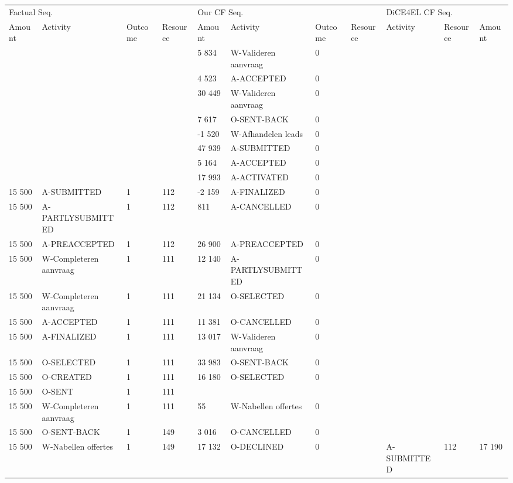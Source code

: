\begin{tabular}{lllllllllll}
\toprule
\multicolumn{4}{l}{Factual Seq.} & \multicolumn{4}{l}{Our CF Seq.} & \multicolumn{3}{l}{DiCE4EL CF Seq.} \\
Amount & Activity & Outcome & Resource & Amount & Activity & Outcome & Resource & Activity & Resource & Amount \\
\midrule
 &  &  &  & 5 834 & W-Valideren aanvraag & 0 &  &  &  &  \\
 &  &  &  & 4 523 & A-ACCEPTED & 0 &  &  &  &  \\
 &  &  &  & 30 449 & W-Valideren aanvraag & 0 &  &  &  &  \\
 &  &  &  & 7 617 & O-SENT-BACK & 0 &  &  &  &  \\
 &  &  &  & -1 520 & W-Afhandelen leads & 0 &  &  &  &  \\
 &  &  &  & 47 939 & A-SUBMITTED & 0 &  &  &  &  \\
 &  &  &  & 5 164 & A-ACCEPTED & 0 &  &  &  &  \\
 &  &  &  & 17 993 & A-ACTIVATED & 0 &  &  &  &  \\
15 500 & A-SUBMITTED & 1 & 112 & -2 159 & A-FINALIZED & 0 &  &  &  &  \\
15 500 & A-PARTLYSUBMITTED & 1 & 112 & 811 & A-CANCELLED & 0 &  &  &  &  \\
15 500 & A-PREACCEPTED & 1 & 112 & 26 900 & A-PREACCEPTED & 0 &  &  &  &  \\
15 500 & W-Completeren aanvraag & 1 & 111 & 12 140 & A-PARTLYSUBMITTED & 0 &  &  &  &  \\
15 500 & W-Completeren aanvraag & 1 & 111 & 21 134 & O-SELECTED & 0 &  &  &  &  \\
15 500 & A-ACCEPTED & 1 & 111 & 11 381 & O-CANCELLED & 0 &  &  &  &  \\
15 500 & A-FINALIZED & 1 & 111 & 13 017 & W-Valideren aanvraag & 0 &  &  &  &  \\
15 500 & O-SELECTED & 1 & 111 & 33 983 & O-SENT-BACK & 0 &  &  &  &  \\
15 500 & O-CREATED & 1 & 111 & 16 180 & O-SELECTED & 0 &  &  &  &  \\
15 500 & O-SENT & 1 & 111 &  &  &  &  &  &  &  \\
15 500 & W-Completeren aanvraag & 1 & 111 & 55 & W-Nabellen offertes & 0 &  &  &  &  \\
15 500 & O-SENT-BACK & 1 & 149 & 3 016 & O-CANCELLED & 0 &  &  &  &  \\
15 500 & W-Nabellen offertes & 1 & 149 & 17 132 & O-DECLINED & 0 &  & A-SUBMITTED & 112 & 17 190 \\

\end{tabular}
